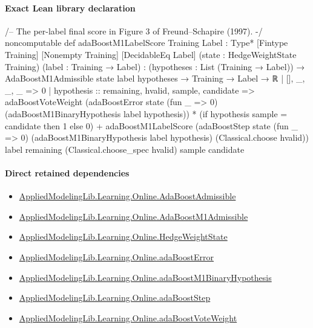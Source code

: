 \documentclass[10pt]{article}
\begin{document}
\paragraph{Exact Lean library declaration}
\begin{ReviewVerbatim}
/-- The per-label final score in Figure 3 of Freund--Schapire (1997). -/
noncomputable def adaBoostM1LabelScore
    {Training Label : Type*} [Fintype Training] [Nonempty Training] [DecidableEq Label]
    (state : HedgeWeightState Training) (label : Training → Label) :
    (hypotheses : List (Training → Label)) →
      AdaBoostM1Admissible state label hypotheses → Training → Label → ℝ
  | [], _, _, _ => 0
  | hypothesis :: remaining, hvalid, sample, candidate =>
      adaBoostVoteWeight
          (adaBoostError state (fun _ => 0) (adaBoostM1BinaryHypothesis label hypothesis)) *
        (if hypothesis sample = candidate then 1 else 0) +
      adaBoostM1LabelScore
        (adaBoostStep state (fun _ => 0) (adaBoostM1BinaryHypothesis label hypothesis)
          (Classical.choose hvalid)) label remaining (Classical.choose_spec hvalid) sample candidate
\end{ReviewVerbatim}

\paragraph{Direct retained dependencies}
\begin{itemize}\raggedright
\item \hyperlink{library-prerequisite-2771987b29f636cf}{Applied\allowbreak{}Modeling\allowbreak{}Lib.\allowbreak{}Learning.\allowbreak{}Online.\allowbreak{}Ada\allowbreak{}Boost\allowbreak{}Admissible}
\item \hyperlink{governing-declaration-69881f7b779e3d0f}{Applied\allowbreak{}Modeling\allowbreak{}Lib.\allowbreak{}Learning.\allowbreak{}Online.\allowbreak{}Ada\allowbreak{}Boost\allowbreak{}M1\allowbreak{}Admissible}
\item \hyperlink{library-prerequisite-8196082d02788389}{Applied\allowbreak{}Modeling\allowbreak{}Lib.\allowbreak{}Learning.\allowbreak{}Online.\allowbreak{}Hedge\allowbreak{}Weight\allowbreak{}State}
\item \hyperlink{governing-declaration-bd631eacbec4687c}{Applied\allowbreak{}Modeling\allowbreak{}Lib.\allowbreak{}Learning.\allowbreak{}Online.\allowbreak{}ada\allowbreak{}Boost\allowbreak{}Error}
\item \hyperlink{governing-declaration-64039473fa91aefa}{Applied\allowbreak{}Modeling\allowbreak{}Lib.\allowbreak{}Learning.\allowbreak{}Online.\allowbreak{}ada\allowbreak{}Boost\allowbreak{}M1\allowbreak{}Binary\allowbreak{}Hypothesis}
\item \hyperlink{governing-declaration-ab9e0307acbbe7ff}{Applied\allowbreak{}Modeling\allowbreak{}Lib.\allowbreak{}Learning.\allowbreak{}Online.\allowbreak{}ada\allowbreak{}Boost\allowbreak{}Step}
\item \hyperlink{governing-declaration-4fae1388d9e0485c}{Applied\allowbreak{}Modeling\allowbreak{}Lib.\allowbreak{}Learning.\allowbreak{}Online.\allowbreak{}ada\allowbreak{}Boost\allowbreak{}Vote\allowbreak{}Weight}
\end{itemize}
\end{document}
